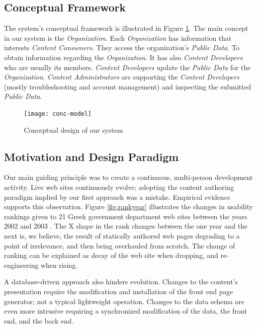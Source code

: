 \documentclass[10pt]{article}
\begin{document}
\subsection{Conceptual Framework}

The system's conceptual framework is illustrated in Figure \ref{fig:conc-model}.
The main concept in our system is the {\em Organization}. Each {\em Organization} has 
information that interests {\em Content Consumers}. They 
access the organization's {\em Public Data}.
To obtain information regarding the {\em Organization}.
It has also {\em Content Developers} 
who are usually its members. {\em Content Developers} update the 
{\em Public Data} for the {\em Organization}. {\em Content Administrators} 
are supporting the {\em Content Developers} 
(mostly troubleshooting and account management)
and inspecting the submitted {\em Public Data}.

\begin{figure}[h!]
\begin{center}
\texttt{[image: conc-model]}
\end{center}
\caption{Conceptual design of our system}
\label{fig:conc-model}
\end{figure}

\subsection{Motivation and Design Paradigm}

Our main guiding principle was to create a continuous, multi-person 
development activity.
Live web sites continuously evolve;
adopting the content authoring paradigm implied
by our first approach was a mistake.
Empirical evidence supports this observation.
Figure \ref{fig:rankyear} illustrates the changes
in usability rankings given to 21 Greek government department
web sites between the years 2002 and 2003 \cite{G03}.
The X shape in the rank changes between the one year and the next
is, we believe, the result of statically authored web pages
degrading to a point of irrelevance, and then being overhauled
from scratch. The change of ranking can be explained as decay of the web site when dropping,
and re-engineering when rising.

A database-driven approach also hinders evolution.
Changes to the content's presentation require the modification
and installation of the front end page generator;
not a typical lightweight operation.
Changes to the data schema are even more intrusive
requiring a synchronized modification of the data,
the front end, and the back end.
\end{document}
